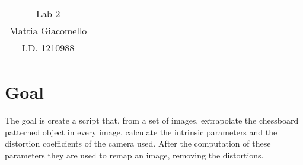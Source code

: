 \documentclass[11pt,a4paper]{article}
\begin{document}
\begin{center}
\begin{tabular}{c}
\LARGE{Lab 2}\\
\large{Mattia Giacomello}\\
I.D. 1210988
\end{tabular}
\end{center}

\section{Goal}
The goal is create a script that, from a set of images, extrapolate the chessboard patterned object in every image, calculate the intrinsic parameters and the distortion coefficients of the camera used.
After the computation of these parameters they are used to remap an image, removing the distortions.
\end{document}
